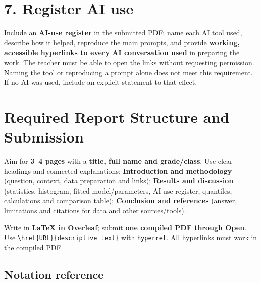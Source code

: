 \section*{7. Register AI use}
Include an \textbf{AI-use register} in the submitted PDF: name each AI tool used, describe how it helped, reproduce the main prompts, and provide \textbf{working, accessible hyperlinks to every AI conversation used} in preparing the work. The teacher must be able to open the links without requesting permission. Naming the tool or reproducing a prompt alone does not meet this requirement. If no AI was used, include an explicit statement to that effect.

\section*{Required Report Structure and Submission}
Aim for \textbf{3--4 pages} with a \textbf{title, full name and grade/class}. Use clear headings and connected explanations: \textbf{Introduction and methodology} (question, context, data preparation and links); \textbf{Results and discussion} (statistics, histogram, fitted model/parameters, AI-use register, quantiles, calculations and comparison table); \textbf{Conclusion and references} (answer, limitations and citations for data and other sources/tools).

Write in \textbf{LaTeX in Overleaf}; submit \textbf{one compiled PDF through Open}. Use \verb|\href{URL}{descriptive text}| with \texttt{hyperref}. All hyperlinks must work in the compiled PDF.


\subsection*{Notation reference}
\label{tone:C10:reference}
